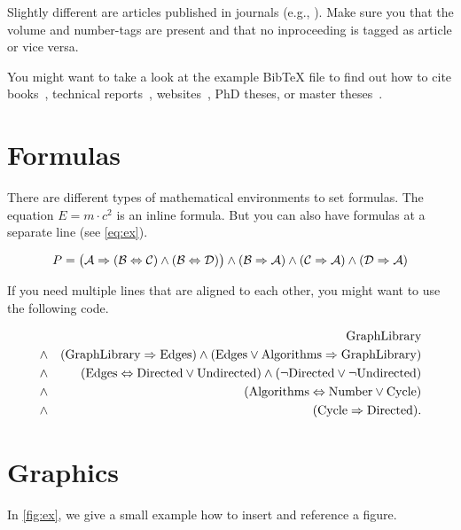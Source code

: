 Slightly different are articles published in journals (e.g., \cite{KG:SME06}). Make sure you that the volume and number-tags are present and that no inproceeding is tagged as article or vice versa.

You might want to take a look at the example BibTeX file to find out how to cite books~\cite{CE:BOOK00}, technical reports~\cite{KCHNP:TR90}, websites~\cite{Coq:website}, PhD theses, or master theses~\cite{B:PHD03,R:MT09}.

\section{Formulas}
 
There are different types of mathematical environments to set formulas. The equation $E=m\cdot c^2$ is an inline formula. But you can also have formulas at a separate line (see \vref{eq:ex}).

	\begin{equation}\label{eq:ex}
			P=\bigl(\mathcal{A}\Rightarrow(\mathcal{B}\Leftrightarrow\mathcal{C})\wedge(\mathcal{B}\Leftrightarrow\mathcal{D})\bigr)\wedge(\mathcal{B}\Rightarrow\mathcal{A})\wedge(\mathcal{C}\Rightarrow\mathcal{A})\wedge(\mathcal{D}\Rightarrow\mathcal{A})
	\end{equation}

If you need multiple lines that are aligned to each other, you might want to use the following code.

	\newcommand{\fG}{\mbox{GraphLibrary}}
	\newcommand{\fE}{\mbox{Edges}}
	\newcommand{\fA}{\mbox{Algorithms}}
	\newcommand{\fD}{\mbox{Directed}}
	\newcommand{\fU}{\mbox{Undirected}}
	\newcommand{\fN}{\mbox{Number}}
	\newcommand{\fC}{\mbox{Cycle}}
	\begin{eqnarray*}
	&& \fG\\
	&\pand& (\fG \pimplies \fE) \pand (\fE \por \fA \pimplies \fG)\\
	&\pand& (\fE \pequals \fD \por \fU) \pand (\pnot \fD \por \pnot \fU)\\
	&\pand& (\fA \pequals \fN \por \fC)\\
	&\pand& (\fC \pimplies \fD).\\
	\end{eqnarray*}

\section{Graphics}

In \vref{fig:ex}, we give a small example how to insert and reference a figure.

